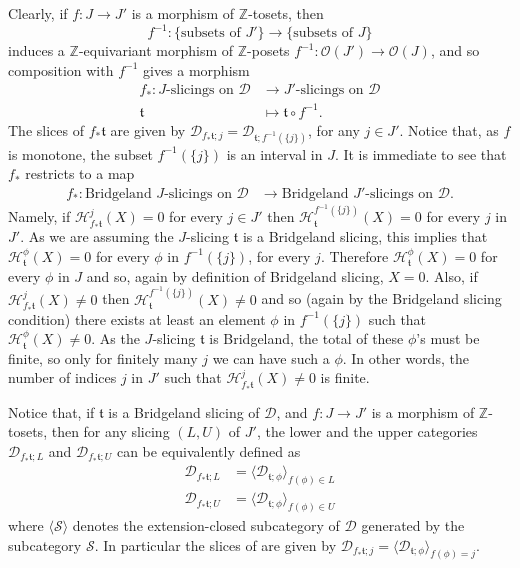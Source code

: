 \documentclass{article}
\theoremstyle{definition}
\newcommand{\Z}{\mathbb{Z}}
\newcommand{\Oo}{\mathcal{O}}
\newcommand{\tee}{\mathfrak{t}}
\begin{document}
Clearly, if $f\colon J\to J'$ is a morphism of $\Z$-tosets, then \[
f^{-1}\colon \{\text{subsets of $J'$}\}\to \{\text{subsets of $J$}\}
\]
 induces a $\Z$-equivariant morphism of $\Z$-posets $f^{-1}\colon \Oo(J')\to \Oo(J)$, and so composition with $f^{-1}$ gives a morphism
\begin{align*}
f_*\colon J\text{-slicings on $\mathscr{D}$}&\to J'\text{-slicings on $\mathscr{D}$}\\
\tee&\mapsto \tee\circ f^{-1}.
\end{align*}
The slices of $f_*\tee$ are given by $\mathscr{D}_{f_*\tee;j}=\mathscr{D}_{\tee;f^{-1}(\{j\})}$, for any $j\in J'$. Notice that, as $f$ is monotone, the subset $f^{-1}(\{j\})$ is an interval in $J$. It is immediate to see that $f_*$ restricts to a map
\begin{align*}
f_*\colon \text{Bridgeland $J$-slicings on $\mathscr{D}$}&\to \text{Bridgeland $J'$-slicings on $\mathscr{D}$}.
\end{align*}
Namely, if $\mathcal{H}^j_{f_*\tee}(X)=0$ for every $j\in J'$ then $\mathcal{H}^{f^{-1}(\{j\})}_{\tee}(X)=0$ for every $j$ in $J'$. As we are assuming the $J$-slicing $\tee$ is a Bridgeland slicing, this implies that $\mathcal{H}^{\phi}_{\tee}(X)=0$ for every $\phi$ in $f^{-1}(\{j\})$, for every $j$. Therefore $\mathcal{H}^{\phi}_{\tee}(X)=0$ for every $\phi$ in $J$ and so, again by definition of Bridgeland slicing, $X=0$. Also, if $\mathcal{H}^j_{f_*\tee}(X)\neq 0$ then $\mathcal{H}^{f^{-1}(\{j\})}_{\tee}(X)\neq 0$ and so (again by the Bridgeland slicing condition) there exists at least an element $\phi$ in $f^{-1}(\{j\})$ such that $\mathcal{H}^{\phi}_{\tee}(X)\neq 0$. As the $J$-slicing $\tee$ is Bridgeland, the total of these $\phi$'s must be finite, so only for finitely many $j$ we can have such a $\phi$. In other words, the number of indices $j$ in $J'$ such that $\mathcal{H}^j_{f_*\tee}(X)\neq 0$ is finite.

Notice that, if $\tee$ is a Bridgeland slicing of $\mathscr{D}$, and $f\colon J\to J'$ is a morphism of $\Z$-tosets, then for any slicing $(L,U)$ of $J'$, the lower and the upper categories
$\mathscr{D}_{f_*\tee;L}$ and $\mathscr{D}_{f_*\tee;U}$ can be equivalently defined as
\begin{align*}
\mathscr{D}_{f_*\tee;L}&=\langle \mathscr{D}_{\tee;\phi}\rangle_{f(\phi)\in L}\\
\mathscr{D}_{f_*\tee;U}&=\langle \mathscr{D}_{\tee;\phi}\rangle_{f(\phi)\in U}
\end{align*}
where $\langle \mathscr{S}\rangle$ denotes the extension-closed subcategory of $\mathscr{D}$ generated by the subcategory $\mathscr{S}$. In particular the slices of are given by 
$\mathscr{D}_{f_*\tee;j}=\langle \mathscr{D}_{\tee;\phi}\rangle_{f(\phi)=j}$.\\
\end{document}

